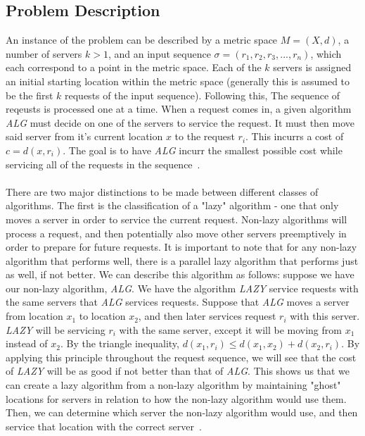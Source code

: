\subsection{Problem Description}
\label{sec:desc}
An instance of the \KS problem can be described by a metric space $M = (X, d)$, a number of servers $k>1$, and an input sequence $\sigma = (r_1, r_2, r_3, ..., r_n)$, which each correspond to a point in the metric space. Each of the $k$ servers is assigned an initial starting location within the metric space (generally this is assumed to be the first $k$ requests of the input sequence). Following this, The sequence of reqeusts is processed one at a time. When a request comes in, a given algorithm \textit{ALG} must decide on one of the servers to service the request. It must then move said server from it's current location $x$ to the request $r_i$. This incurrs a cost of $c = d(x, r_i)$. The goal is to have \textit{ALG} incurr the smallest possible cost while servicing all of the requests in the sequence~\cite{OnlineComp1998}.
\\ \\
There are two major distinctions to be made between different classes of algorithms. The first is the classification of a "lazy" algorithm - one that only moves a server in order to service the current request. Non-lazy algorithms will process a request, and then potentially also move other servers preemptively in order to prepare for future requests. It is important to note that for any non-lazy algorithm that performs well, there is a parallel lazy algorithm that performs just as well, if not better. We can describe this algorithm as follows: suppose we have our non-lazy algorithm, \textit{ALG}. We have the algorithm \textit{LAZY} service requests with the same servers that \textit{ALG} services requests. Suppose that \textit{ALG} moves a server from location $x_1$ to location $x_2$, and then later services request $r_i$ with this server. \textit{LAZY} will be servicing $r_i$ with the same server, except it will be moving from $x_1$ instead of $x_2$. By the triangle inequality, $d(x_1, r_i) \leq d(x_1, x_2) + d(x_2, r_i)$. By applying this principle throughout the request sequence, we will see that the cost of \textit{LAZY} will be as good if not better than that of \textit{ALG}. This shows us that we can create a lazy algorithm from a non-lazy algorithm by maintaining "ghost" locations for servers in relation to how the non-lazy algorithm would use them. Then, we can determine which server the non-lazy algorithm would use, and then service that location with the correct server~\cite{OnlineComp1998}.
